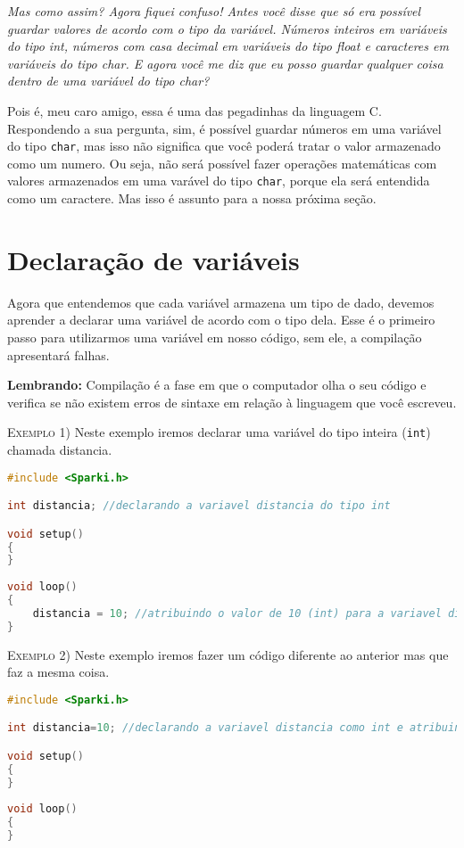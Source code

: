 \textit{Mas como assim? Agora fiquei confuso!  Antes você disse que só era possível guardar valores de acordo com o tipo da variável. Números inteiros em variáveis do tipo int, números com casa decimal em variáveis do tipo float e caracteres em variáveis do tipo char. E agora você me diz que eu posso guardar qualquer coisa dentro de uma variável do tipo char? } \par
Pois é, meu caro amigo, essa é uma das pegadinhas da linguagem C. Respondendo a sua pergunta, sim, é possível guardar números em uma variável do tipo \lstinline[columns=fixed]{char}, mas isso não significa que você poderá tratar o valor armazenado como um numero. Ou seja, não será possível fazer operações matemáticas com valores armazenados em uma varável do tipo \lstinline[columns=fixed]{char}, porque ela será entendida como um caractere. Mas isso é assunto para a nossa próxima seção.

\section{Declaração de variáveis}

Agora que entendemos que cada variável armazena um tipo de dado, devemos aprender a declarar uma variável de acordo com o tipo dela. Esse é o primeiro passo para utilizarmos uma variável em nosso código, sem ele, a compilação apresentará falhas.

\begin{center}
    \textcolor{mydarkblue!80!black}{\textbf{Lembrando:}} Compilação é a fase em que o computador olha o seu código e verifica se não existem erros de sintaxe em relação à linguagem que você escreveu.
\end{center}

\textsc{Exemplo 1)} Neste exemplo iremos declarar uma variável do tipo inteira (\lstinline[columns=fixed]{int}) chamada distancia.
\begin{lstlisting}[language=C]
#include <Sparki.h> 

int distancia; //declarando a variavel distancia do tipo int

void setup()
{
}
 
void loop()
{
    distancia = 10; //atribuindo o valor de 10 (int) para a variavel distancia
}
\end{lstlisting}

\textsc{Exemplo 2)} Neste exemplo iremos fazer um código diferente ao anterior mas que faz a mesma coisa.
\begin{lstlisting}[language=C]
#include <Sparki.h> 

int distancia=10; //declarando a variavel distancia como int e atribuindo o valor 10 a ela

void setup()
{
}
 
void loop()
{
}
\end{lstlisting}

